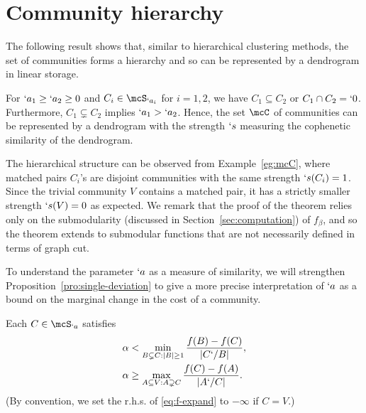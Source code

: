 
\section{Community hierarchy}
\label{sec:hierarchy}

The following result shows that, similar to hierarchical clustering methods, the set of communities
forms a hierarchy and so can be represented by a dendrogram in linear storage.

\begin{theorem}
  \label{thm:hierarchy}
  For $`a_1\geq `a_2\geq 0$ and $C_i\in \mcS_{`a_i}$ for $i=1,2$, we have $C_1\subseteq C_2$ or
  $C_1\cap C_2=`0$. Furthermore, $C_1\subsetneq C_2$ implies $`a_1>`a_2$. Hence, the set $\mcC$ of communities can be represented by a dendrogram with the strength $`s$ measuring the cophenetic similarity of the dendrogram.
\end{theorem}

The hierarchical structure can be observed from Example~\ref{eg:mcC}, where matched pairs $C_i$'s
are disjoint communities with the same strength $`s(C_i)=1$. Since the trivial community $V$
contains a matched pair, it has a strictly smaller strength $`s(V)=0$ as expected.
We remark that the proof of the theorem relies only on the submodularity (discussed in Section~\ref{sec:computation}) of
$f_{\beta}$, and so the theorem extends to submodular functions that are not necessarily defined in
terms of graph cut. 

To understand the parameter $`a$ as a measure of similarity, we will strengthen
Proposition~\ref{pro:single-deviation} to give a more precise interpretation of $`a$ as a bound
on the marginal change in the cost of a community.
\begin{theorem}
  \label{thm:f-shrink-expand}
  Each $C\in \mcS_{`a}$ satisfies%
  \begin{subequations}
    \label{eq:f-shrink-expand}
    \begin{align}
      \label{eq:f-shrink}
      \alpha &< \min_{B\subsetneq C:|B|\geq 1} \frac{f(B) - f(C)}{|C`/ B|}, \\
      \label{eq:f-expand}
      \alpha &\geq \max_{A\subseteq V:A\supsetneq C} \frac{f(C) - f(A)}{|A`/ C|}. 
    \end{align}
  \end{subequations}
  (By convention, we set the r.h.s. of \eqref{eq:f-expand} to $-\infty$ if $C=V$.)
\end{theorem}

